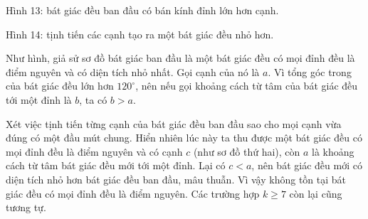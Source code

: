 \documentclass[11pt]{article}
\begin{document}
\begin{center}

\small Hình 13: bát giác đều ban đầu có bán kính đỉnh lớn hơn cạnh.

\vspace{1em}


\small Hình 14: tịnh tiến các cạnh tạo ra một bát giác đều nhỏ hơn.
\end{center}

Như hình, giả sử sơ đồ bát giác ban đầu là một bát giác đều có mọi đỉnh đều là
điểm nguyên và có diện tích nhỏ nhất. Gọi cạnh của nó là \(a\). Vì tổng góc
trong của bát giác đều lớn hơn \(120^\circ\), nên nếu gọi khoảng cách từ tâm
của bát giác đều tới một đỉnh là \(b\), ta có \(b>a\).

Xét việc tịnh tiến từng cạnh của bát giác đều ban đầu sao cho mọi cạnh vừa
đúng có một đầu mút chung. Hiển nhiên lúc này ta thu được một bát giác đều có
mọi đỉnh đều là điểm nguyên và có cạnh \(c\) (như sơ đồ thứ hai), còn \(a\) là
khoảng cách từ tâm bát giác đều mới tới một đỉnh. Lại có \(c<a\), nên bát
giác đều mới có diện tích nhỏ hơn bát giác đều ban đầu, mâu thuẫn. Vì vậy
không tồn tại bát giác đều có mọi đỉnh đều là điểm nguyên. Các trường hợp
\(k\ge 7\) còn lại cũng tương tự.
\end{document}
